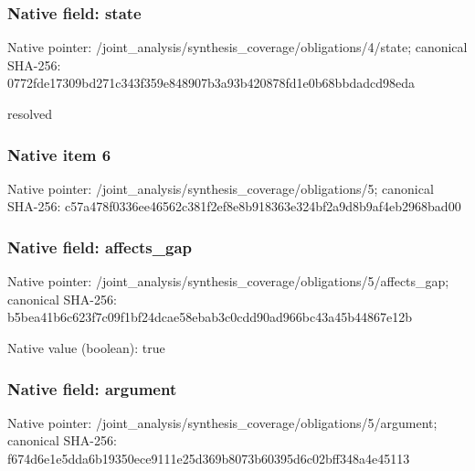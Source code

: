 \documentclass[10pt,a4paper]{article}
\begin{document}
\subsubsection{Native field: state}
Native pointer: /joint\_\allowbreak{}analysis/synthesis\_\allowbreak{}coverage/obligations/4/state; canonical SHA-256: 0772fde17309bd271c343f359e848907b3a93b420878fd1e0b68bbdadcd98eda

\begingroup\raggedright\sloppy resolved\par\endgroup

\subsubsection{Native item 6}
Native pointer: /joint\_\allowbreak{}analysis/synthesis\_\allowbreak{}coverage/obligations/5; canonical SHA-256: c57a478f0336ee46562c381f2ef8e8b918363e324bf2a9d8b9af4eb2968bad00

\subsubsection{Native field: affects\_\allowbreak{}gap}
Native pointer: /joint\_\allowbreak{}analysis/synthesis\_\allowbreak{}coverage/obligations/5/affects\_\allowbreak{}gap; canonical SHA-256: b5bea41b6c623f7c09f1bf24dcae58ebab3c0cdd90ad966bc43a45b44867e12b

Native value (boolean): true

\subsubsection{Native field: argument}
Native pointer: /joint\_\allowbreak{}analysis/synthesis\_\allowbreak{}coverage/obligations/5/argument; canonical SHA-256: f674d6e1e5dda6b19350ece9111e25d369b8073b60395d6c02bff348a4e45113
\end{document}
